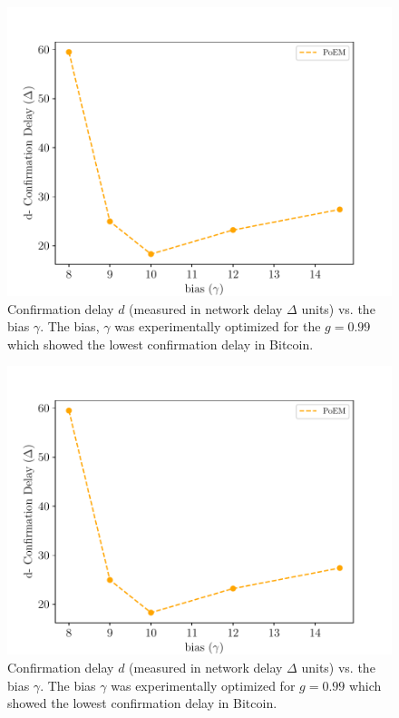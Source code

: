\iftwocolumn
\begin{figure}[h]
    \centering
    \includegraphics[width=\columnwidth,keepaspectratio]{figures/gamma.pdf}
    \caption{Confirmation delay $d$ (measured in network delay $\Delta$ units) vs. the bias $\gamma$. The bias, $\gamma$ was experimentally optimized for the $g = 0.99$ which showed the lowest confirmation delay in Bitcoin.
    }
    \label{fig:bias}
\end{figure}
\else
\begin{figure}[h]
    \centering
    \includegraphics[width=0.8 \columnwidth,keepaspectratio]{figures/gamma.pdf}
    \caption{Confirmation delay $d$ (measured in network delay $\Delta$ units) vs. the bias $\gamma$. The bias $\gamma$ was experimentally optimized for $g = 0.99$ which showed the lowest confirmation delay in Bitcoin.
    }
    \label{fig:bias}
\end{figure}
\fi